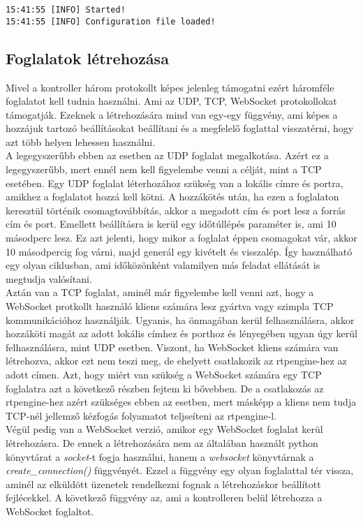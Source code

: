 \begin{lstlisting}
15:41:55 [INFO] Started!
15:41:55 [INFO] Configuration file loaded!
\end{lstlisting}

\subsection{Foglalatok létrehozása}

Mivel a kontroller három protokollt képes jelenleg támogatni ezért háromféle foglalatot 
kell tudnia használni. Ami az UDP, TCP, WebSocket protokollokat támogatják. Ezeknek a
létrehozására mind van egy-egy függvény, ami képes a hozzájuk tartozó beállításokat 
beállítani és a megfelelő foglattal visszatérni, hogy azt több helyen lehessen használni. \\

A legegyszerűbb ebben az esetben az UDP foglalat megalkotása. Azért ez a legegyszerűbb,
mert ennél nem kell figyelembe venni a célját, mint a TCP esetében. Egy UDP foglalat 
léterhozához szükség van a lokális címre és portra, amikhez a foglalatot hozzá kell 
kötni. A hozzákötés után, ha ezen a foglalaton keresztül történik csomagtovábbítás, 
akkor a megadott cím és port lesz a forrás cím és port. Emellett beállításra is
kerül egy időtúllépés paraméter is, ami 10 másodperc lesz. Ez azt jelenti, hogy
mikor a foglalat éppen csomagokat vár, akkor 10 másodpercig fog várni, majd generál 
egy kivételt és visszalép. Így használható egy olyan ciklusban, ami időközönként
valamilyen más feladat ellátását is megtudja valósítani. \\

Aztán van a TCP foglalat, aminél már figyelembe kell venni azt, hogy a WebSocket
protkollt használó kliens számára lesz gyártva vagy szimpla TCP kommunikációhoz 
használják. Ugyanis, ha önmagában kerül felhasználásra, akkor hozzáköti magát
az adott lokális címhez és porthoz és lényegében ugyan úgy kerül felhasználásra,
mint UDP esetben. Viszont, ha WebSocket kliens számára van létrehozva, akkor ezt
nem teszi meg, de ehelyett csatlakozik az rtpengine-hez az adott címen. Azt, hogy
miért van szükség a WebSocket számára egy TCP foglalatra azt a következő részben 
fejtem ki bővebben. De a csatlakozás az rtpengine-hez azért szükséges ebben az
esetben, mert másképp a kliens nem tudja TCP-nél jellemző kézfogás folyamatot
teljseíteni az rtpengine-l. \\

Végül pedig van a WebSocket verzió, amikor egy WebSocket foglalat kerül létrehozásra.
De ennek a létrehozására nem az általában használt python könyvtárat a \textit{socket}-t
fogja használni, hanem a \textit{websocket} könyvtárnak a \textit{create\_connection()}
függvényét. Ezzel a függvény egy olyan foglalattal tér vissza, aminél az elküldött 
üzenetek rendelkezni fognak a létrehozáskor beállított fejlécekkel. A következő 
függvény az, ami a kontrolleren belül létrehozza a WebSocket foglaltot. 

